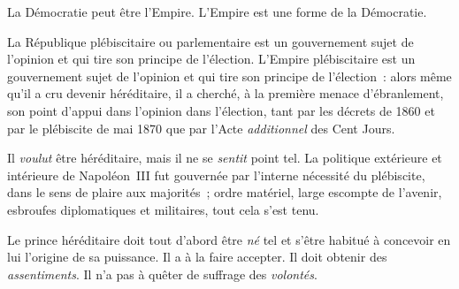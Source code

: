 \documentclass[french,twoside]{book} %
\newcommand{\astermono}{\medskip\centerline{\color{rubric}\large\selectfont{\syms ✻}}\medskip\par}%
\begin{document}
\astermono

\noindent La Démocratie peut être l’Empire. L’Empire est une forme de la Démocratie.\par
La République plébiscitaire ou parlementaire est un gouvernement sujet de l’opinion et qui tire son principe de l’élection. L’Empire plébiscitaire est un gouvernement sujet de l’opinion et qui tire son principe de l’élection : alors même qu’il a cru devenir héréditaire, il a cherché, à la première menace d’ébranlement, son point d’appui dans l’opinion dans l’élection, tant par les décrets de 1860 et par le plébiscite de mai 1870 que par l’Acte \emph{additionnel} des Cent Jours.\par
Il \emph{voulut} être héréditaire, mais il ne se \emph{sentit} point tel. La politique extérieure et intérieure de Napoléon III fut gouvernée par l’interne nécessité du plébiscite, dans le sens de plaire aux majorités ; ordre matériel, large escompte de l’avenir, esbroufes diplomatiques et militaires, tout cela s’est tenu.\par
Le prince héréditaire doit tout d’abord être \emph{né} tel et s’être habitué à concevoir en lui l’origine de sa puissance. Il a à la faire accepter. Il doit obtenir des \emph{assentiments}. Il n’a pas à quêter de suffrage des \emph{volontés}.\par

\astermono
\end{document}
